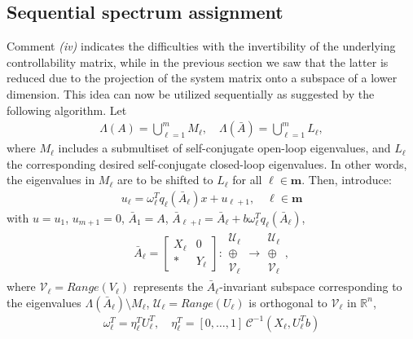 \documentclass[conference]{IEEEtran}
\newcommand{\msu}{\mathcal{U}}
\newcommand{\msv}{\mathcal{V}}
\newcommand{\numm}{\boldsymbol{m}}
\newcommand{\om}{\omega}
\begin{document}
\subsection{Sequential spectrum assignment}
\label{Sequential spectrum assignment}
Comment \emph{(iv)} indicates the difficulties with the invertibility
of the underlying controllability matrix, while in the previous
section we saw that the latter is reduced due to the projection of the
system matrix onto a subspace of a lower dimension. This idea can now be utilized sequentially as suggested by the
following algorithm. Let
\begin{align}
  \varLambda(A) = \bigcup_{\ell=1}^m M_{\ell}, \quad   \varLambda(\bar A) = \bigcup_{\ell=1}^m L_{\ell},
\label{eq:eigvals}
\end{align}
where $M_\ell$ includes a submultiset of self-conjugate open-loop
eigenvalues, and $L_\ell$ the corresponding desired self-conjugate
closed-loop eigenvalues. In other words, the eigenvalues in $M_\ell$
are to be shifted to $L_\ell$ for all $\ell\in\numm$. Then, introduce:
\begin{align}
  u_{\ell} = \omega^T_{\ell}q_{\ell}(\bar A_{\ell}) x +u_{\ell+1}, \quad \ell\in\numm
\label{eq:sequent}
\end{align}
with $u=u_{1}$, $u_{m+1}=0$, $\bar A_1 = A$, $\bar A_{\ell+l} = \bar A_{\ell}+ b \omega^T_{\ell}q_{\ell}(\bar A_{\ell})$,
\begin{align}
\label{eq:geom1}
{\bar A_\ell} = \begin{bmatrix} X_\ell & 0 \\ \ast & Y_\ell \end{bmatrix} : \begin{matrix} \mathcal{U}_\ell \\ \oplus \\ \mathcal{V}_\ell \end{matrix} \rightarrow \begin{matrix} \mathcal{U}_\ell \\ \oplus \\ \mathcal{V}_\ell \end{matrix},
\end{align}
where $\msv_\ell=\textit{Range}(V_\ell)$ represents the $\bar A_\ell$-invariant subspace corresponding to the eigenvalues $\varLambda(\bar A_\ell)\setminus M_\ell$, $\msu_\ell=\textit{Range}(U_\ell)$ is orthogonal to $\msv_\ell$ in $\mathbb{R}^n$,
\begin{align}
\om^T_{\ell} = \eta_\ell^T U^T_\ell,\quad \eta^T_\ell=  [0,\ldots,1]\,\mathcal{C}^{-1}(X_\ell,U_\ell^T b)
\label{eq:sequent}
\end{align}
\end{document}
